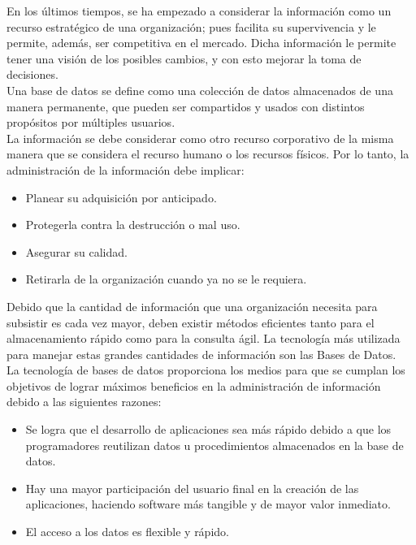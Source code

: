 	En los \'ultimos tiempos, se ha empezado a considerar la informaci\'on como un recurso estrat\'egico de una organizaci\'on; pues facilita su supervivencia y le permite, adem\'as, ser competitiva en el mercado. Dicha informaci\'on le permite tener una visi\'on de los posibles cambios, y con esto mejorar la toma de decisiones.\\

	Una base de datos se define como una colecci\'on de datos almacenados de una manera permanente, que pueden ser compartidos y usados con distintos prop\'ositos por m\'ultiples usuarios.\\

	La informaci\'on se debe considerar como otro recurso corporativo de la misma manera que se considera el recurso humano o los recursos f\'isicos. Por lo tanto, la administraci\'on de la informaci\'on debe implicar:

	\begin{itemize}
		\item Planear su adquisici\'on por anticipado.
		\item Protegerla contra la destrucci\'on o mal uso.
		\item Asegurar su calidad.
		\item Retirarla de la organizaci\'on cuando ya no se le requiera.
	\end{itemize}


	Debido que la cantidad de informaci\'on que una organizaci\'on necesita para subsistir es cada vez mayor, deben existir m\'etodos eficientes tanto para el almacenamiento r\'apido como para la consulta \'agil. La tecnolog\'ia m\'as utilizada para manejar estas grandes cantidades de informaci\'on son las Bases de Datos.\\

	La tecnolog\'ia de bases de datos proporciona los medios para que se cumplan los objetivos de lograr m\'aximos beneficios en la administraci\'on de informaci\'on debido a las siguientes razones:

	\begin{itemize}
		\item Se logra que el desarrollo de aplicaciones sea m\'as r\'apido debido a que los programadores reutilizan datos u procedimientos almacenados en la base de datos.
		\item Hay una mayor participaci\'on del usuario final en la creaci\'on de las aplicaciones, haciendo software m\'as tangible y de mayor valor inmediato.
		\item El acceso a los datos es flexible y r\'apido.
	\end{itemize}


